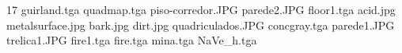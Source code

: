 17
guirland.tga
quadmap.tga
piso-corredor.JPG
parede2.JPG
floor1.tga
acid.jpg
metalsurface.jpg
bark.jpg
dirt.jpg
quadriculados.JPG
concgray.tga
parede1.JPG
trelica1.JPG
fire1.tga
fire.tga
mina.tga
NaVe_h.tga
